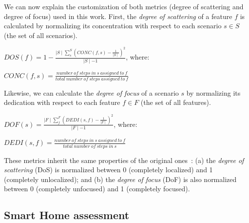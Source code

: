 \documentclass{acm_proc_article-sp}
\begin{document}

We can now explain the customization of both metrics (degree of scattering and degree of focus) used in this work. First, the \emph{degree of scattering} of a feature $f$ is
calculated by normalizing its concentration with respect to each scenario $s \in
S$ (the set of all scenarios).

\begin{center}
$DOS(f) = 1 - \frac{\mid S \mid \sum_{s}^{S}(CONC(f,s)-\frac{1}{\mid S
\mid})^2}{\mid S \mid -1}$, where:

$CONC(f,s) = \frac{number\ of\ steps\ in\ s\ assigned\ to\ f}{total\ number\
of\ steps\ assigned\ to\ f}$
\end{center}

Likewise, we can calculate the \emph{degree of focus} of a scenario $s$ by
normalizing its dedication with respect to each feature $f \in F$ (the set of
all features).

\begin{center}
$DOF(s) = \frac{\mid F \mid \sum_{f}^{F}(DEDI(s,f)-\frac{1}{\mid F
\mid})^2}{\mid F \mid -1}$, where:

$DEDI(s,f) = \frac{number\ of\ steps\ in\ s\ assigned\ to\ f}{total\ number\
of\ steps\ in\ s}$
\end{center}

These metrics inherit the same properties of the original
ones~\cite{Eaddy:2007aa}: (a) the
\emph{degree of scattering} (DoS) is normalized between 0 (completely localized)
and 1 (completely unlocalized); and (b) the \emph{degree of focus} (DoF) is also
normalized between 0 (completely unfocused) and 1 (completely focused).


\subsection{Smart Home assessment}
\end{document}
